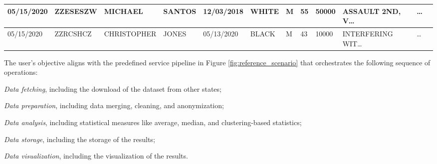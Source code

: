 \begin{table*}[!t]
\begin{adjustbox}{max totalsize={.99\linewidth}{\textheight},center}
\begin{tabular}{|l|l|l|l|l|l|l|l|l|l|l|l|}
      05/15/2020             & ZZESESZW    & MICHAEL        & SANTOS         & 12/03/2018   & WHITE         & M               & 55           & 50000         & ASSAULT 2ND, V\dots  & \dots          \\ \hline
      05/15/2020             & ZZRCSHCZ    & CHRISTOPHER    & JONES          & 05/13/2020   & BLACK         & M               & 43           & 10000         & INTERFERING WIT\dots & \dots          \\ \hline
    \end{tabular}
    \egroup
  \end{adjustbox}

\end{table*}

The user's objective aligns with the predefined service pipeline in Figure \ref{fig:reference_scenario} that orchestrates the following sequence of operations:
\begin{enumerate*}[label=(\roman*)]
  \item \emph{Data fetching}, including the download of the dataset from other states;
  \item \emph{Data preparation}, including data merging, cleaning, and anonymization;
  \item \emph{Data analysis}, including statistical measures like average, median, and clustering-based statistics;
  \item \emph{Data storage}, including the storage of the results;
  \item \emph{Data visualization}, including the visualization of the results.
\end{enumerate*}


